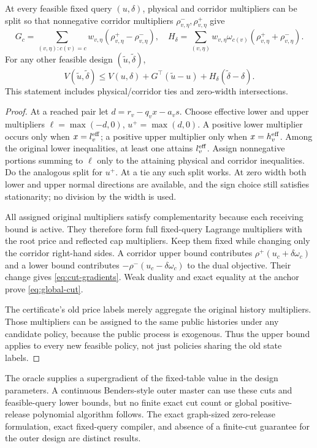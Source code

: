 \begin{proposition}\label{prop:cuts}
At every feasible fixed query $(u,\delta)$, physical and corridor multipliers can be split so that nonnegative corridor multipliers $\rho^-_{v,\eta},\rho^+_{v,\eta}$ give
\begin{equation}\label{eq:cut-gradients}
 G_c=\sum_{(v,\eta):c(v)=c}w_{v,\eta}(\rho^+_{v,\eta}-\rho^-_{v,\eta}),\quad
 H_\delta=\sum_{(v,\eta)}w_{v,\eta}\omega_{c(v)}(\rho^+_{v,\eta}+\rho^-_{v,\eta}).
\end{equation}
For any other feasible design $(\widetilde u,\widetilde\delta)$,
\begin{equation}\label{eq:global-cut}
 V(\widetilde u,\widetilde\delta)\leq V(u,\delta)+G^\top(\widetilde u-u)
       +H_\delta(\widetilde\delta-\delta).
\end{equation}
This statement includes physical/corridor ties and zero-width intersections.
\end{proposition}
\begin{proof}
At a reached pair let $d=r_v-q_vx-a_vs$. Choose effective lower and upper multipliers $\ell=\max(-d,0)$, $u^+=\max(d,0)$. A positive lower multiplier occurs only when $x=l_v^{\rm eff}$; a positive upper multiplier only when $x=h_v^{\rm eff}$. Among the original lower inequalities, at least one attains $l_v^{\rm eff}$. Assign nonnegative portions summing to $\ell$ only to the attaining physical and corridor inequalities. Do the analogous split for $u^+$. At a tie any such split works. At zero width both lower and upper normal directions are available, and the sign choice still satisfies stationarity; no division by the width is used.

All assigned original multipliers satisfy complementarity because each receiving bound is active. They therefore form full fixed-query Lagrange multipliers with the root price and reflected cap multipliers. Keep them fixed while changing only the corridor right-hand sides. A corridor upper bound contributes $\rho^+(u_c+\delta\omega_c)$ and a lower bound contributes $-\rho^-(u_c-\delta\omega_c)$ to the dual objective. Their change gives \eqref{eq:cut-gradients}. Weak duality and exact equality at the anchor prove \eqref{eq:global-cut}.

The certificate's old price labels merely aggregate the original history multipliers. Those multipliers can be assigned to the same public histories under any candidate policy, because the public process is exogenous. Thus the upper bound applies to every new feasible policy, not just policies sharing the old state labels.\end{proof}

The oracle supplies a supergradient of the fixed-table value in the design parameters. A continuous Benders-style outer master can use these cuts and feasible-query lower bounds, but no finite exact cut count or global positive-release polynomial algorithm follows. The exact graph-sized zero-release formulation, exact fixed-query compiler, and absence of a finite-cut guarantee for the outer design are distinct results.
